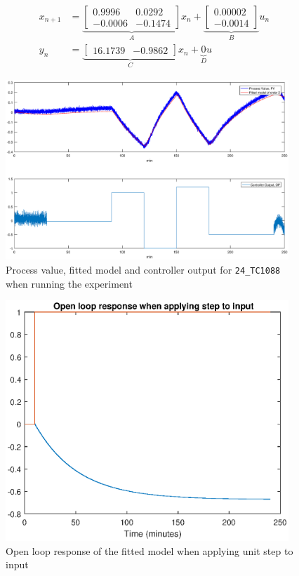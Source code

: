 \begin{equation}
	\begin{aligned}
		x_{n+1} &= \underbrace{\begin{bmatrix}
			0.9996 & 0.0292 \\ -0.0006 & -0.1474
		\end{bmatrix}}_{A} x_n +
		\underbrace{\begin{bmatrix}
			0.00002 \\ -0.0014
		\end{bmatrix}}_{B} u_n \\
		y_n &= \underbrace{\begin{bmatrix}
			16.1739 & -0.9862
		\end{bmatrix}}_{C} x_n + 
		\underbrace{0}_{D} u
	\end{aligned}
\end{equation}


\begin{figure}[ht!]
	\centering
	\includegraphics[width=0.95\textwidth]{fig/identification/tc1088_identify.eps}
	\caption{Process value, fitted model and controller output for \texttt{24\_TC1088} when running the experiment}
	\label{fig:tc1088_exp}
\end{figure}
\begin{figure}[ht!]
	\centering
	\includegraphics[width=0.95\textwidth]{fig/identification/tc1088_OL.eps}
	\caption{Open loop response of the fitted model when applying unit step to input}
	\label{fig:tc1088_OL}
\end{figure}

